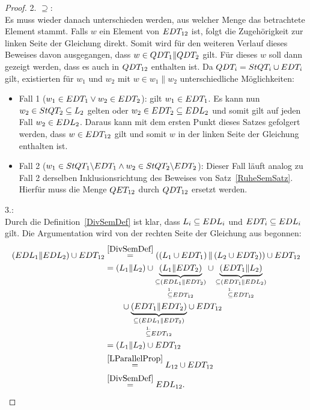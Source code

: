 \begin{proof}
  2. \glqq$\supseteq$\grqq{}:\\
  Es muss wieder danach unterschieden werden, aus welcher Menge das betrachtete
  Element stammt. Falls $w$ ein Element von $EDT _{12}$ ist, folgt die
  Zugehörigkeit zur linken Seite der Gleichung direkt. Somit wird für den
  weiteren Verlauf dieses Beweises davon ausgegangen, dass $w\in QDT _1\|QDT
  _2$ gilt. Für dieses $w$ soll dann gezeigt werden, dass es auch in $QDT
  _{12}$ enthalten ist. Da $QDT _i=StQT _i\cup EDT _i$ gilt, existierten für
  $w_1$ und $w_2$ mit $w\in w_1\|w_2$ unterschiedliche Möglichkeiten:
  \begin{itemize}
    \item Fall 1 ($w_1\in EDT _1\lor w_2\in EDT _2$): \OBdA{} gilt $w_1\in EDT
      _1$. Es kann nun $w_2\in StQT _2\subseteq L_2$ gelten oder $w_2\in EDT
      _2\subseteq EDL _2$ und somit gilt auf jeden Fall $w_2\in EDL _2$.
      Daraus kann mit dem ersten Punkt dieses Satzes gefolgert werden, dass
      $w\in EDT _{12}$ gilt und somit $w$ in der linken Seite der Gleichung
      enthalten ist.
    \item Fall 2 ($w_1\in StQT _1\backslash EDT _1\land w_2\in StQT
      _2\backslash EDT _2$): Dieser Fall läuft analog zu Fall 2 derselben
      Inklusionsrichtung des Beweises von Satz~\ref{RuheSemSatz}. Hierfür muss
      die Menge $QET _{12}$ durch $QDT _{12}$ ersetzt werden.
  \end{itemize}

  3.:\\
  Durch die Definition~\ref{DivSemDef} ist klar, dass $L_i\subseteq EDL _i$ und
  $EDT _i\subseteq EDL _i$ gilt. Die Argumentation wird von der rechten Seite
  der Gleichung aus begonnen:
  \begin{align*}
    (EDL _1\| EDL _2)\cup EDT _{12}
    &\overset{\ref{DivSemDef}}{=}\left(\left(L _1\cup EDT _1\right)\|\left(L
    _2\cup EDT _2\right)\right)\cup EDT _{12}\\
    &=(L _1\|L _2) \cup \underset{\overset{1.}{\subseteq} EDT
    _{12}}{\underset{\subseteq (EDL _1\|EDT _2)}{\underbrace{(L _1\|EDT
    _2)}}} \cup \underset{\overset{1.}{\subseteq} EDT
    _{12}}{\underset{\subseteq (EDT _1\|EDL _2)}{\underbrace{(EDT _1\|L
    _2)}}}\\
    &\quad\quad\cup \underset{\overset{1.}{\subseteq} EDT
    _{12}}{\underset{\subseteq (EDL _1\|EDT _2)}{\underbrace{(EDT _1\|EDT
    _2)}}} \cup EDT _{12}\\
    &=(L _1\|L _2) \cup EDT _{12}\\
    &\overset{\ref{LParallelProp}}{=}L _{12}\cup EDT _{12}\\
    &\overset{\ref{DivSemDef}}{=}EDL _{12}.
  \end{align*}
\end{proof}

